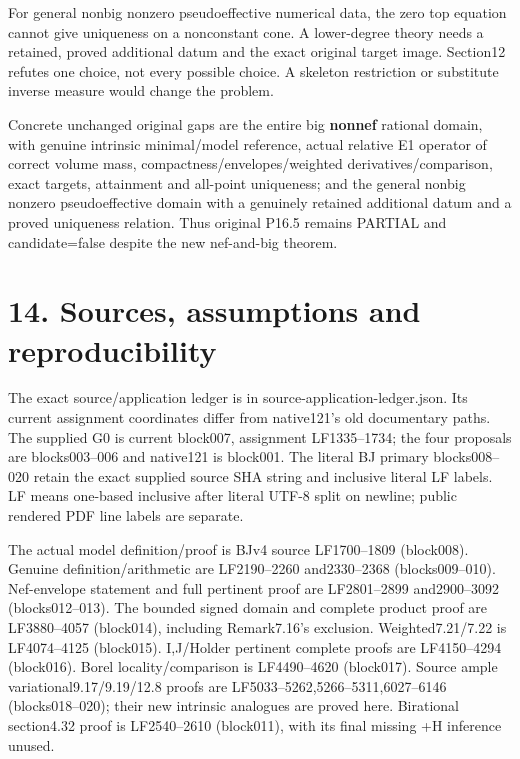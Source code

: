 \documentclass[
  10pt,
]{article}
\begin{document}
For general nonbig nonzero pseudoeffective numerical data, the zero top
equation cannot give uniqueness on a nonconstant cone. A lower-degree
theory needs a retained, proved additional datum and the exact original
target image. Section12 refutes one choice, not every possible choice. A
skeleton restriction or substitute inverse measure would change the
problem.

Concrete unchanged original gaps are the entire big \textbf{nonnef}
rational domain, with genuine intrinsic minimal/model reference, actual
relative E1 operator of correct volume mass,
compactness/envelopes/weighted derivatives/comparison, exact targets,
attainment and all-point uniqueness; and the general nonbig nonzero
pseudoeffective domain with a genuinely retained additional datum and a
proved uniqueness relation. Thus original P16.5 remains PARTIAL and
candidate=false despite the new nef-and-big theorem.

\section{14. Sources, assumptions and
reproducibility}\label{sources-assumptions-and-reproducibility}

The exact source/application ledger is in
source-application-ledger.json. Its current assignment coordinates
differ from native121's old documentary paths. The supplied G0 is
current block007, assignment LF1335--1734; the four proposals are
blocks003--006 and native121 is block001. The literal BJ primary
blocks008--020 retain the exact supplied source SHA string and inclusive
literal LF labels. LF means one-based inclusive after literal UTF-8
split on newline; public rendered PDF line labels are separate.

The actual model definition/proof is BJv4 source LF1700--1809
(block008). Genuine definition/arithmetic are LF2190--2260 and2330--2368
(blocks009--010). Nef-envelope statement and full pertinent proof are
LF2801--2899 and2900--3092 (blocks012--013). The bounded signed domain
and complete product proof are LF3880--4057 (block014), including
Remark7.16's exclusion. Weighted7.21/7.22 is LF4074--4125 (block015).
I,J/Holder pertinent complete proofs are LF4150--4294 (block016). Borel
locality/comparison is LF4490--4620 (block017). Source ample
variational9.17/9.19/12.8 proofs are LF5033--5262,5266--5311,6027--6146
(blocks018--020); their new intrinsic analogues are proved here.
Birational section4.32 proof is LF2540--2610 (block011), with its final
missing +H inference unused.
\end{document}

